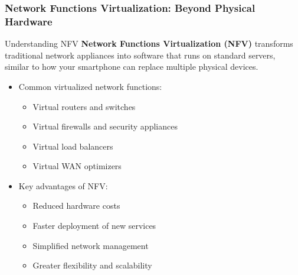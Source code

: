 \documentclass{beamer}
\begin{document}
\begin{frame}
    \frametitle{Network Functions Virtualization: Beyond Physical Hardware}
    
    \begin{block}{Understanding NFV}
        \textbf{Network Functions Virtualization (NFV)} transforms traditional network appliances into software that runs on standard servers, similar to how your smartphone can replace multiple physical devices.
    \end{block}
    
    \begin{itemize}
        \item Common virtualized network functions:
        \begin{itemize}
            \item Virtual routers and switches
            \item Virtual firewalls and security appliances
            \item Virtual load balancers
            \item Virtual WAN optimizers
        \end{itemize}
        
        \item Key advantages of NFV:
        \begin{itemize}
            \item Reduced hardware costs
            \item Faster deployment of new services
            \item Simplified network management
            \item Greater flexibility and scalability
        \end{itemize}
    \end{itemize}
\end{frame}
\end{document}
